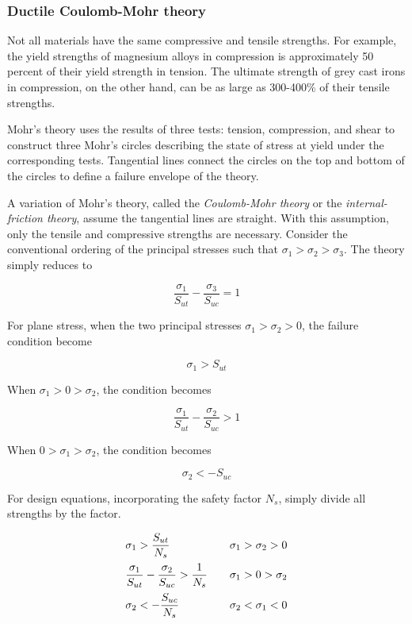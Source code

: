 \documentclass[a4paper,openany,nobib]{tufte-book}
\begin{document}
\subsubsection{Ductile Coulomb-Mohr theory}
\label{ductile-coulomb-mohr-theory}
Not all materials have the same compressive and tensile strengths. For
example, the yield strengths of magnesium alloys in compression is
approximately 50 percent of their yield strength in tension. The
ultimate strength of grey cast irons in compression, on the other hand,
can be as large as 300-400\% of their tensile strengths.

Mohr's theory uses the results of three tests: tension, compression, and
shear to construct three Mohr's circles describing the state of stress
at yield under the corresponding tests. Tangential lines connect the
circles on the top and bottom of the circles to define a failure
envelope of the theory.

A variation of Mohr's theory, called the \emph{Coulomb-Mohr theory} or the
\emph{internal-friction theory}, assume the tangential lines are straight.
With this assumption, only the tensile and compressive strengths are
necessary. Consider the conventional ordering of the principal stresses
such that \(\sigma_1 > \sigma_2 > \sigma_3\). The theory simply reduces to

$$\frac{\sigma_1}{S_{ut}} - \frac{\sigma_3}{S_{uc}} = 1$$

For plane stress, when the two principal stresses
\(\sigma_1 > \sigma_2 > 0\), the failure condition become

$$\sigma_1 > S_{ut}$$

When \(\sigma_1 > 0 > \sigma_2\), the condition becomes

$$\frac{\sigma_1}{S_{ut}} - \frac{\sigma_2}{S_{uc}} > 1$$

When \(0 > \sigma_1 > \sigma_2\), the condition becomes

$$\sigma_2 <  - S_{uc}$$


For design equations, incorporating the safety factor \(N_s\), simply
divide all strengths by the factor.

$$\begin{array}{l l l}
  \sigma_1 > \dfrac{S_{ut}}{N_s} & & \sigma_1 > \sigma_2 > 0 \\[10pt]
  \dfrac{\sigma_1}{S_{ut}} - \dfrac{\sigma_2}{S_{uc}} > \dfrac{1}{N_s} & & \sigma_1 > 0 > \sigma_2 \\[10pt]
    \sigma_2 <  -\dfrac{S_{uc}}{N_s} & & \sigma_2 < \sigma_1 < 0
  \end{array}$$
\end{document}
